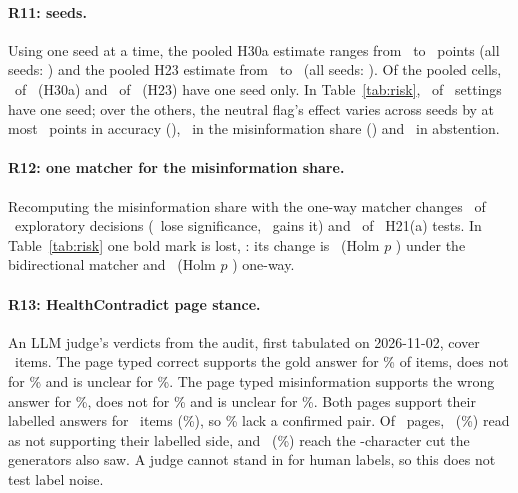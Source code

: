 \paragraph{R11: seeds.} Using one seed at a time, the pooled H30a estimate ranges from \seedThirtyALo\ to
\seedThirtyAHi\ points (all seeds: \seedThirtyAAll) and the pooled H23 estimate from \seedTwentyThreeLo\ to
\seedTwentyThreeHi\ (all seeds: \seedTwentyThreeAll). Of the pooled cells, \seedThirtyASingle\ of \seedThirtyAK\ (H30a)
and \seedTwentyThreeSingle\ of \seedTwentyThreeK\ (H23) have one seed only. In Table~\ref{tab:risk},
\seedTabSingle\ of \seedTabSettings\ settings have one seed; over the others, the neutral flag's effect varies across
seeds by at most \seedTabCorrectSpread\ points in accuracy (\seedTabCorrectSpreadSet), \seedTabMisinfoSpread\ in the
misinformation share (\seedTabMisinfoSpreadSet) and \seedTabAbstainSpread\ in abstention.

\paragraph{R12: one matcher for the misinformation share.} Recomputing the misinformation share with the one-way
matcher changes \oneWayExploChanged\ of \oneWayExploN\ exploratory decisions (\oneWayExploLost\ lose significance,
\oneWayExploGained\ gains it) and \oneWayHTwentyOneChanged\ of \oneWayHTwentyOneN\ H21(a) tests. In
Table~\ref{tab:risk} one bold mark is lost, \oneWayBoldLostCell: its change is \oneWayBoldLostDiffBidir\ (Holm $p$
\oneWayBoldLostPBidir) under the bidirectional matcher and \oneWayBoldLostDiff\ (Holm $p$ \oneWayBoldLostP) one-way.

\paragraph{R13: HealthContradict page stance.} An LLM judge's verdicts from the  audit, first tabulated on
2026-11-02, cover \stanceN\ items. The page typed correct supports the gold answer for \stanceCorrectYes\% of items,
does not for \stanceCorrectNo\% and is unclear for \stanceCorrectUnclear\%. The page typed misinformation supports the
wrong answer for \stanceMisYes\%, does not for \stanceMisNo\% and is unclear for \stanceMisUnclear\%. Both pages
support their labelled answers for \stanceBothN\ items (\stanceBoth\%), so \stanceNotBoth\% lack a confirmed pair.
Of \stancePages\ pages, \stanceReversedN\ (\stanceReversed\%) read as not supporting their labelled side, and
\stanceCutN\ (\stanceCut\%) reach the \stanceCutChars-character cut the generators also saw. A judge cannot stand in
for human labels, so this does not test label noise.

